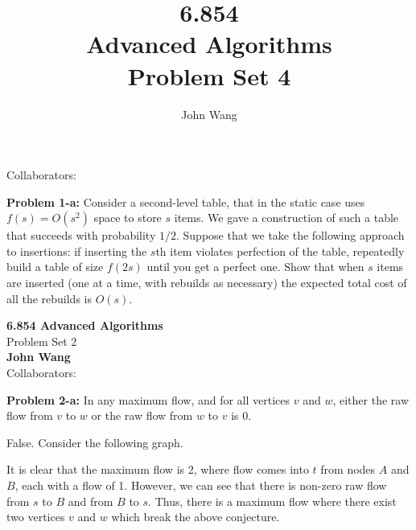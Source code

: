 \documentclass[psamsfonts]{amsart}
\title{6.854 \\
Advanced Algorithms \\
Problem Set 4}
\author{John Wang}
\newenvironment{sol}{\vspace{0.25cm}{\large \bfseries Solution:}}{\qedsymbol}
\newenvironment{prob}[1]{\begin{framed}{\large \bfseries Problem #1:}}{\end{framed}}
\newcommand{\makenewtitle}{
    \begin{center}
    {\huge \bfseries 6.854 Advanced Algorithms} \\
    Problem Set 2\\
    \vspace{0.25cm}
    {\bfseries John Wang} \\
    Collaborators:
    \end{center}
    \vspace{0.5cm}
}
\begin{document}
\maketitle

Collaborators: 

\begin{prob}{1-a}
Consider a second-level table, that in the static case uses $f(s) = O(s^2)$ space to store $s$ items. We gave a construction of such a table that succeeds with probability $1/2$. Suppose that we take the following approach to insertions: if inserting the $s$th item violates perfection of the table, repeatedly build a table of size $f(2s)$ until you get a perfect one. Show that when $s$ items are inserted (one at a time, with rebuilds as necessary) the expected total cost of all the rebuilds is $O(s)$. 
\end{prob}

\begin{sol}

\end{sol}

\newpage 
\makenewtitle

\begin{prob}{2-a}
In any maximum flow, and for all vertices $v$ and $w$, either the raw flow from $v$ to $w$ or the raw flow from $w$ to $v$ is 0.
\end{prob}
\begin{sol}
False. Consider the following graph.

\begin{figure}[h!]
\centering
{}
\end{figure}

It is clear that the maximum flow is 2, where flow comes into $t$ from nodes $A$ and $B$, each with a flow of 1. However, we can see that there is non-zero raw flow from $s$ to $B$ and from $B$ to $s$. Thus, there is a maximum flow where there exist two vertices $v$ and $w$ which break the above conjecture.
\end{sol}
\end{document}
